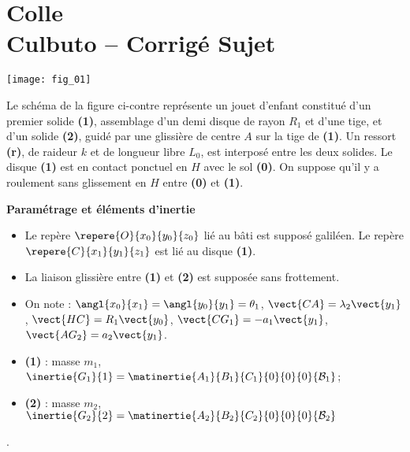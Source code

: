 \chapter*{Colle  \\ 
Culbuto -- \ifprof Corrigé \else Sujet \fi}

\iflivret {} \else
\ifprof  {} \else \fi
\fi

\setcounter{question}{0}



\begin{marginfigure}
\texttt{[image: fig\_01]}
\end{marginfigure}
Le schéma de la figure ci-contre représente un jouet d’enfant constitué d’un premier solide \textbf{(1)}, assemblage d’un demi disque de rayon $R_1$ et d’une tige, et d’un solide \textbf{(2)}, guidé par une glissière de centre $A$ sur la tige de \textbf{(1)}.
Un ressort \textbf{(r)}, de raideur $k$ et de longueur libre $L_0$, est interposé entre les deux solides.
Le disque \textbf{(1)} est en contact ponctuel en $H$ avec le sol \textbf{(0)}. On suppose qu’il y a roulement sans glissement en $H$ entre \textbf{(0)} et \textbf{(1)}.

\textbf{Paramétrage et éléments d'inertie}
\begin{itemize}
\item Le repère $\repere{O}{x_0}{y_0}{z_0}$ lié au bâti est supposé galiléen. Le repère $\repere{C}{x_1}{y_1}{z_1}$ est lié au disque \textbf{(1)}.
\item La liaison glissière entre \textbf{(1)} et \textbf{(2)} est supposée sans frottement.
\item On note : $\angl{x_0}{x_1}=\angl{y_0}{y_1}=\theta_1$, 
$\vect{CA}=\lambda_2\vect{y_1}$, 
$\vect{HC}=R_1\vect{y_0}$,  
$\vect{CG_1}=-a_1\vect{y_1}$,
$\vect{AG_2}=a_2\vect{y_1}$.
\item \textbf{(1)} : masse $m_1$, $\inertie{G_1}{1}=\matinertie{A_1}{B_1}{C_1}{0}{0}{0}{\mathcal{B}_1}$;
\item \textbf{(2)} : masse $m_2$, $\inertie{G_2}{2}=\matinertie{A_2}{B_2}{C_2}{0}{0}{0}{\mathcal{B}_2}$
\end{itemize}.



